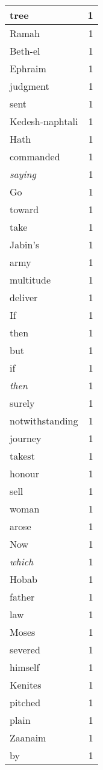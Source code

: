 \begin{center}
\begin{longtable}{l|r}
tree & 1\\ \hline 
Ramah & 1\\ \hline 
Beth-el & 1\\ \hline 
Ephraim & 1\\ \hline 
judgment & 1\\ \hline 
sent & 1\\ \hline 
Kedesh-naphtali & 1\\ \hline 
Hath & 1\\ \hline 
commanded & 1\\ \hline 
\emph{saying} & 1\\ \hline 
Go & 1\\ \hline 
toward & 1\\ \hline 
take & 1\\ \hline 
Jabin's & 1\\ \hline 
army & 1\\ \hline 
multitude & 1\\ \hline 
deliver & 1\\ \hline 
If & 1\\ \hline 
then & 1\\ \hline 
but & 1\\ \hline 
if & 1\\ \hline 
\emph{then} & 1\\ \hline 
surely & 1\\ \hline 
notwithstanding & 1\\ \hline 
journey & 1\\ \hline 
takest & 1\\ \hline 
honour & 1\\ \hline 
sell & 1\\ \hline 
woman & 1\\ \hline 
arose & 1\\ \hline 
Now & 1\\ \hline 
\emph{which} & 1\\ \hline 
Hobab & 1\\ \hline 
father & 1\\ \hline 
law & 1\\ \hline 
Moses & 1\\ \hline 
severed & 1\\ \hline 
himself & 1\\ \hline 
Kenites & 1\\ \hline 
pitched & 1\\ \hline 
plain & 1\\ \hline 
Zaanaim & 1\\ \hline 
by & 1\\ \hline 

\end{longtable}
\end{center}
